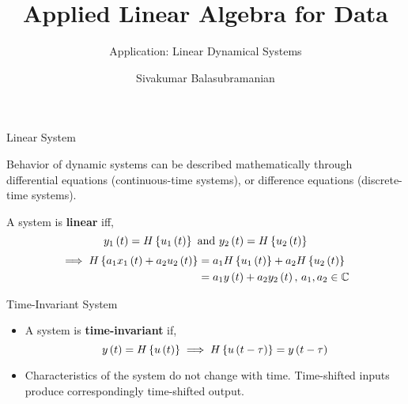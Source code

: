 \documentclass[aspectratio=169]{beamer}
\title{Applied Linear Algebra for Data}
\subtitle{Application: Linear Dynamical Systems}
\author{Sivakumar Balasubramanian}
\institute[Christian Medical College] %
{
  \inst{}%
  Department of Bioengineering\\
  Christian Medical College, Bagayam\\
  Vellore 632002
}
\date{}
\let\olditem\item
\renewcommand{\item}{\setlength{\itemsep}{\fill}\olditem}
\def\lp{\ensuremath\left(}
\def\rp{\ensuremath\right)}
\def\lc{\ensuremath\left\{}
\def\rc{\ensuremath\right\}}
\begin{document}


\begin{frame}
  \titlepage
\end{frame}


\begin{frame}{Linear System}
\begin{center}
\end{center}

Behavior of dynamic systems can be described mathematically through differential equations (continuous-time systems), or difference equations (discrete-time systems).
\vspace{0.25cm}

A system is \textbf{linear} iff, 
\[ y_1\lp t\rp = H\lc u_1\lp t\rp\rc \text{ and } y_2\lp t\rp = H\lc u_2 \lp t\rp \rc\]
\[ \begin{split}
    \implies H\lc a_1x_1\lp t\rp + a_2u_2\lp t\rp \rc &= a_1H\lc u_1\lp t\rp\rc + a_2H\lc u_2\lp t\rp \rc\\
    &= a_1y\lp t\rp + a_2y_2\lp t\rp, \, a_1, a_2 \in \mathbb{C}
\end{split}
\]
\end{frame}


\begin{frame}{Time-Invariant System}
\begin{center}
\end{center}
\begin{itemize}
    \item A system is \textbf{time-invariant} if,
    \[ y\lp t\rp = H\lc u\lp t\rp\rc \implies H\lc u \lp t - \tau \rp \rc = y\lp t - \tau \rp \]

    \item Characteristics of the system do not change with time. Time-shifted inputs produce correspondingly time-shifted output.
\end{itemize}
\end{frame}
\end{document}
